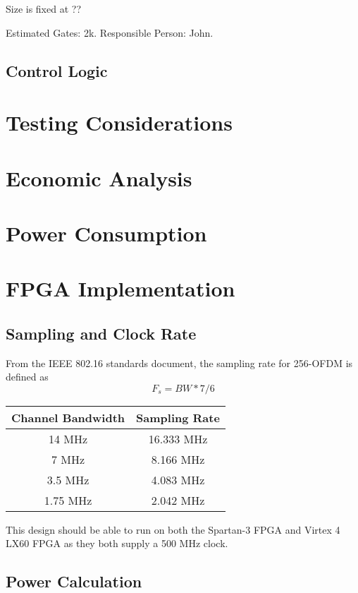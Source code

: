 \documentclass[dvips,10pt,twocolumn]{article}
\begin{document}
	Size is fixed at ??

	Estimated Gates: 2k.
	Responsible Person: John.

	\subsection{Control Logic}
	\label{sec:ctrl}

\section{Testing Considerations}
\section{Economic Analysis}
\section{Power Consumption}
\section{FPGA Implementation}
  \subsection{Sampling and Clock Rate}
    From the IEEE 802.16 standards document, the sampling rate for
    256-OFDM is defined as
    \begin{equation}
    F_s = BW * 7/6
    \end{equation}
  
  \begin{center}
  \begin{tabular}{c|c}
  Channel Bandwidth & Sampling Rate \\ \hline
  14 MHz & 16.333 MHz \\
  7 MHz & 8.166 MHz \\
  3.5 MHz & 4.083 MHz \\
  1.75 MHz & 2.042 MHz
  \end{tabular}
  \end{center}
  
  This design should be able to run on both the Spartan-3 FPGA and Virtex 4 LX60
  FPGA as they both supply a 500 MHz clock.
  
  \subsection{Power Calculation}
  
\end{document}
